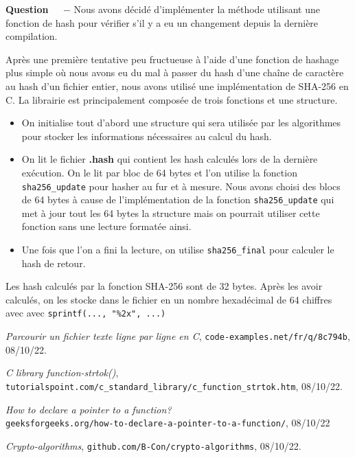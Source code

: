 \documentclass[11pt]{article}
\newcounter{question}[section]
\newenvironment{question}[1][]{\refstepcounter{question}\par\medskip
   \noindent\textbf{Question~\thequestion ~ $-$} \rmfamily}{}
\begin{document}
\begin{question} %
	Nous avons décidé d'implémenter la méthode utilisant une fonction de hash pour vérifier s'il y a eu un changement depuis la dernière compilation.

	Après une première tentative peu fructueuse à l'aide d'une fonction de hashage plus simple où nous avons eu du mal à passer du hash d'une chaîne de caractère au hash d'un fichier entier, nous avons utilisé
	une implémentation de SHA-256 en C\cite{hash}. La librairie est principalement composée de trois fonctions et une structure.
	\begin{itemize}
		\item On initialise tout d'abord une structure qui sera utilisée par les algorithmes pour stocker les informations nécessaires au calcul du hash.
		\item On lit le fichier \textbf{.hash} qui contient les hash calculés lors de la dernière exécution. On le lit par bloc de 64 bytes et l'on utilise la fonction \texttt{sha256\_update} pour hasher au fur et à mesure.
		Nous avons choisi des blocs de 64 bytes à cause de l'implémentation de la fonction \texttt{sha256\_update} qui met à jour tout les 64 bytes la structure mais on pourrait utiliser cette fonction sans une lecture formatée ainsi.
		\item Une fois que l'on a fini la lecture, on utilise \texttt{sha256\_final} pour calculer le hash de retour.
	\end{itemize}

	Les hash calculés par la fonction SHA-256 sont de 32 bytes. Après les avoir calculés, on les stocke dans le fichier en un nombre hexadécimal de 64 chiffres avec avec \texttt{sprintf(..., "\%2x", ...)}

\end{question}



\begin{thebibliography}{99}
  \textit{Parcourir un fichier texte ligne par ligne en C},
  \texttt{code-examples.net/fr/q/8c794b},
  08/10/22.

  \textit{C library function-strtok()},
  \texttt{\\tutorialspoint.com/c\_standard\_library/c\_function\_strtok.htm},
  08/10/22.

  \textit{How to declare a pointer to a function?}
  \texttt{\\geeksforgeeks.org/how-to-declare-a-pointer-to-a-function/}, 
  08/10/22
  
  \textit{Crypto-algorithms},
  \texttt{github.com/B-Con/crypto-algorithms},
  08/10/22.


\end{thebibliography}
\end{document}
